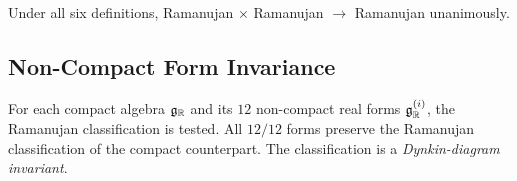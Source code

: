 Under all six definitions, Ramanujan $\times$ Ramanujan $\to$ Ramanujan unanimously.

\subsection{Non-Compact Form Invariance}\label{app:noncompact_invariance}

For each compact algebra $\mathfrak{g}_{\mathbb{R}}$ and its $12$ non-compact real forms $\mathfrak{g}_{\mathbb{R}}^{(i)}$, the Ramanujan classification is tested. All $12/12$ forms preserve the Ramanujan classification of the compact counterpart. The classification is a \emph{Dynkin-diagram invariant}.
